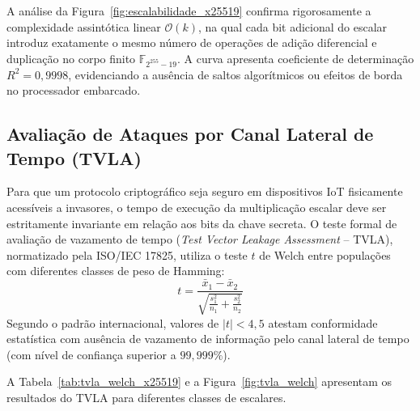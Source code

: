 A análise da Figura~\ref{fig:escalabilidade_x25519} confirma rigorosamente a complexidade assintótica linear $\mathcal{O}(k)$, na qual cada bit adicional do escalar introduz exatamente o mesmo número de operações de adição diferencial e duplicação no corpo finito $\mathbb{F}_{2^{255}-19}$. A curva apresenta coeficiente de determinação $R^2 = 0{,}9998$, evidenciando a ausência de saltos algorítmicos ou efeitos de borda no processador embarcado.

\subsection{Avaliação de Ataques por Canal Lateral de Tempo (TVLA)}
\label{subsec:tvla_welch}

Para que um protocolo criptográfico seja seguro em dispositivos IoT fisicamente acessíveis a invasores, o tempo de execução da multiplicação escalar deve ser estritamente invariante em relação aos bits da chave secreta. O teste formal de avaliação de vazamento de tempo (\textit{Test Vector Leakage Assessment} -- TVLA), normatizado pela ISO/IEC 17825, utiliza o teste $t$ de Welch entre populações com diferentes classes de peso de Hamming:
\begin{equation}
    t = \frac{\bar{x}_1 - \bar{x}_2}{\sqrt{\frac{s_1^2}{n_1} + \frac{s_2^2}{n_2}}}
\end{equation}
Segundo o padrão internacional, valores de $|t| < 4{,}5$ atestam conformidade estatística com ausência de vazamento de informação pelo canal lateral de tempo (com nível de confiança superior a $99{,}999\%$).

A Tabela~\ref{tab:tvla_welch_x25519} e a Figura~\ref{fig:tvla_welch} apresentam os resultados do TVLA para diferentes classes de escalares.

